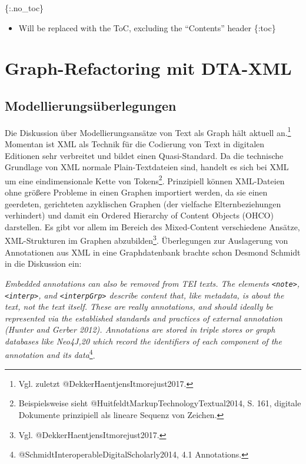 \documentclass[ngerman,]{scrreprt}
\providecommand{\tightlist}{%
  \setlength{\itemsep}{0pt}\setlength{\parskip}{0pt}}
\begin{document}
\{:.no\_toc\}

\begin{itemize}
\tightlist
\item
  Will be replaced with the ToC, excluding the ``Contents'' header \{:toc\}
\end{itemize}

\chapter{Graph-Refactoring mit DTA-XML}\label{graph-refactoring-mit-dta-xml}

\section{Modellierungsüberlegungen}\label{modellierungsuxfcberlegungen}

Die Diskussion über Modellierungsansätze von Text als Graph hält aktuell an.\footnote{Vgl. zuletzt @DekkerHaentjensItmorejust2017.} Momentan ist XML als Technik für die Codierung von Text in digitalen Editionen sehr verbreitet und bildet einen Quasi-Standard. Da die technische Grundlage von XML normale Plain-Textdateien sind, handelt es sich bei XML um eine eindimensionale Kette von Tokens\footnote{Beispielsweise sieht @HuitfeldtMarkupTechnologyTextual2014, S. 161, digitale Dokumente prinzipiell als lineare Sequenz von Zeichen.}. Prinzipiell können XML-Dateien ohne größere Probleme in einen Graphen importiert werden, da sie einen geerdeten, gerichteten azyklischen Graphen (der vielfache Elternbeziehungen verhindert) und damit ein Ordered Hierarchy of Content Objects (OHCO) darstellen. Es gibt vor allem im Bereich des Mixed-Content verschiedene Ansätze, XML-Strukturen im Graphen abzubilden\footnote{Vgl. @DekkerHaentjensItmorejust2017.}. Überlegungen zur Auslagerung von Annotationen aus XML in eine Graphdatenbank brachte schon Desmond Schmidt in die Diskussion ein:

\emph{Embedded annotations can also be removed from TEI texts. The elements \texttt{\textless{}note\textgreater{}}, \texttt{\textless{}interp\textgreater{}}, and \texttt{\textless{}interpGrp\textgreater{}} describe content that, like metadata, is about the text, not the text itself. These are really annotations, and should ideally be represented via the established standards and practices of external annotation (Hunter and Gerber 2012). Annotations are stored in triple stores or graph databases like Neo4J,20 which record the identifiers of each component of the annotation and its data}\footnote{@SchmidtInteroperableDigitalScholarly2014, 4.1 Annotations.}.
\end{document}

